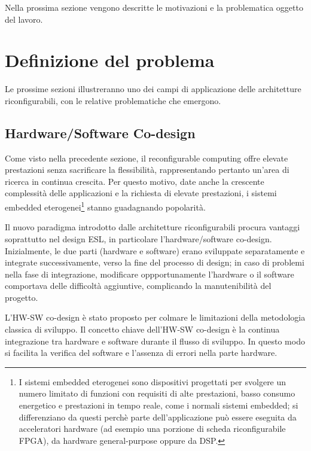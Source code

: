 
Nella prossima sezione vengono descritte le motivazioni e la problematica oggetto del
lavoro.

\section{Definizione del problema}
\label{sec:definizioneProblema}
Le prossime sezioni illustreranno uno dei campi di applicazione delle architetture
riconfigurabili, con le relative problematiche che emergono.

\subsection{Hardware/Software Co-design}
Come visto nella precedente sezione, il reconfigurable computing offre elevate
prestazioni senza sacrificare la flessibilità, rappresentando pertanto un'area di
ricerca in continua crescita. Per questo motivo, date anche la crescente complessità
delle applicazioni e la richiesta di elevate prestazioni, i sistemi embedded
eterogenei\footnote{I sistemi embedded eterogenei sono dispositivi progettati per
svolgere un numero limitato di funzioni con requisiti di alte prestazioni, basso consumo
energetico e prestazioni in tempo reale, come i normali sistemi embedded; si
differenziano da questi perchè parte dell'applicazione può essere eseguita da
acceleratori hardware (ad esempio una porzione di scheda riconfigurabile FPGA), da
hardware general-purpose oppure da \ac{DSP}.} stanno guadagnando popolarità.

Il nuovo paradigma introdotto dalle architetture riconfigurabili procura vantaggi
soprattutto nel design \ac{ESL}, in particolare l'\mbox{hardware/software} co-design.
Inizialmente, le due parti (hardware e software) erano sviluppate separatamente e integrate
successivamente, verso la fine del processo di design; in caso di problemi nella fase di
integrazione, modificare oppportunamente l'hardware o il software comportava delle difficoltà
aggiuntive, complicando la manutenibilità del progetto.

L'HW-SW co-design è stato proposto per colmare le limitazioni della metodologia classica di
sviluppo. Il concetto chiave dell'HW-SW co-design è la continua integrazione tra hardware e software
durante il flusso di sviluppo. In questo modo si facilita la verifica del software e l'assenza di
errori nella parte hardware.

